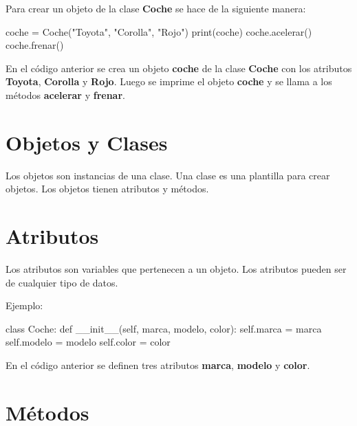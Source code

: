 \documentclass[
  a4paper,
  DIV=11,
  numbers=noendperiod,
  onepage,
  openany]{scrreprt}
\newenvironment{Shaded}{\begin{snugshade}}{\end{snugshade}}
\newcommand{\BuiltInTok}[1]{\textcolor[rgb]{0.00,0.23,0.31}{#1}}
\newcommand{\FunctionTok}[1]{\textcolor[rgb]{0.28,0.35,0.67}{#1}}
\newcommand{\KeywordTok}[1]{\textcolor[rgb]{0.00,0.23,0.31}{#1}}
\newcommand{\NormalTok}[1]{\textcolor[rgb]{0.00,0.23,0.31}{#1}}
\newcommand{\OperatorTok}[1]{\textcolor[rgb]{0.37,0.37,0.37}{#1}}
\newcommand{\StringTok}[1]{\textcolor[rgb]{0.13,0.47,0.30}{#1}}
\newcommand{\VariableTok}[1]{\textcolor[rgb]{0.07,0.07,0.07}{#1}}
\begin{document}
Para crear un objeto de la clase \textbf{Coche} se hace de la siguiente
manera:

\begin{Shaded}
\begin{Highlighting}[]
\NormalTok{coche }\OperatorTok{=}\NormalTok{ Coche(}\StringTok{"Toyota"}\NormalTok{, }\StringTok{"Corolla"}\NormalTok{, }\StringTok{"Rojo"}\NormalTok{)}
\BuiltInTok{print}\NormalTok{(coche)}
\NormalTok{coche.acelerar()}
\NormalTok{coche.frenar()}
\end{Highlighting}
\end{Shaded}

En el código anterior se crea un objeto \textbf{coche} de la clase
\textbf{Coche} con los atributos \textbf{Toyota}, \textbf{Corolla} y
\textbf{Rojo}. Luego se imprime el objeto \textbf{coche} y se llama a
los métodos \textbf{acelerar} y \textbf{frenar}.

\section{Objetos y Clases}\label{objetos-y-clases}

Los objetos son instancias de una clase. Una clase es una plantilla para
crear objetos. Los objetos tienen atributos y métodos.

\section{Atributos}\label{atributos}

Los atributos son variables que pertenecen a un objeto. Los atributos
pueden ser de cualquier tipo de datos.

Ejemplo:

\begin{Shaded}
\begin{Highlighting}[]
\KeywordTok{class}\NormalTok{ Coche:}
    \KeywordTok{def} \FunctionTok{\_\_init\_\_}\NormalTok{(}\VariableTok{self}\NormalTok{, marca, modelo, color):}
        \VariableTok{self}\NormalTok{.marca }\OperatorTok{=}\NormalTok{ marca}
        \VariableTok{self}\NormalTok{.modelo }\OperatorTok{=}\NormalTok{ modelo}
        \VariableTok{self}\NormalTok{.color }\OperatorTok{=}\NormalTok{ color}
\end{Highlighting}
\end{Shaded}

En el código anterior se definen tres atributos \textbf{marca},
\textbf{modelo} y \textbf{color}.

\section{Métodos}\label{muxe9todos}
\end{document}
